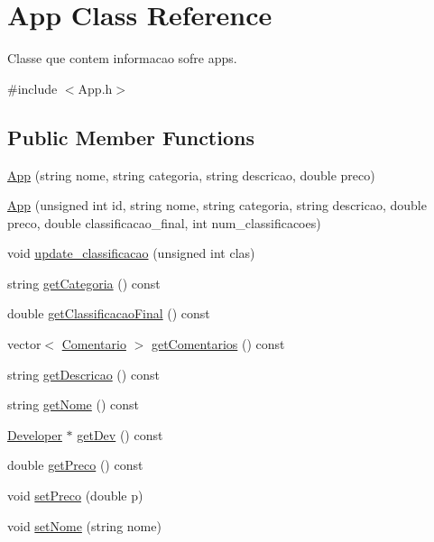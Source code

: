 \hypertarget{class_app}{\section{App Class Reference}
\label{class_app}
}


Classe que contem informacao sofre apps.  




{\ttfamily \#include $<$App.\+h$>$}

\subsection*{Public Member Functions}
\begin{DoxyCompactItemize}
\item 
\hyperlink{class_app_ae491b91a0a622aa5f78559403b83e0df}{App} (string nome, string categoria, string descricao, double preco)
\item 
\hyperlink{class_app_a77f4deed2edae59b74f5aca757c1368a}{App} (unsigned int id, string nome, string categoria, string descricao, double preco, double classificacao\+\_\+final, int num\+\_\+classificacoes)
\item 
void \hyperlink{class_app_ac720715c2e11bfc218842141b9c6e0d2}{update\+\_\+classificacao} (unsigned int clas)
\item 
string \hyperlink{class_app_a58076d5e40336d8f1489f49ebcc648ac}{get\+Categoria} () const 
\item 
double \hyperlink{class_app_a99b0df2b556e0d0967af13f37b47178e}{get\+Classificacao\+Final} () const 
\item 
vector$<$ \hyperlink{class_comentario}{Comentario} $>$ \hyperlink{class_app_a55940da54fefa49300678f6ce87eeb04}{get\+Comentarios} () const 
\item 
string \hyperlink{class_app_a2dcf86011e3b1e8dc8d027f4b4b4b253}{get\+Descricao} () const 
\item 
string \hyperlink{class_app_a7b94ca7878eb536a1d1b1448c2072bea}{get\+Nome} () const 
\item 
\hyperlink{class_developer}{Developer} $\ast$ \hyperlink{class_app_a94de3c0569d8c300a634c5e058da70da}{get\+Dev} () const 
\item 
double \hyperlink{class_app_a203cc8ebea02cf4cabb736c3c4e8bc51}{get\+Preco} () const 
\item 
void \hyperlink{class_app_ab9723a9ef1383d41b9960e07de4c5691}{set\+Preco} (double p)
\item 
void \hyperlink{class_app_a779936463595bd7babe3fabdd3b81530}{set\+Nome} (string nome)

\end{DoxyCompactItemize}
